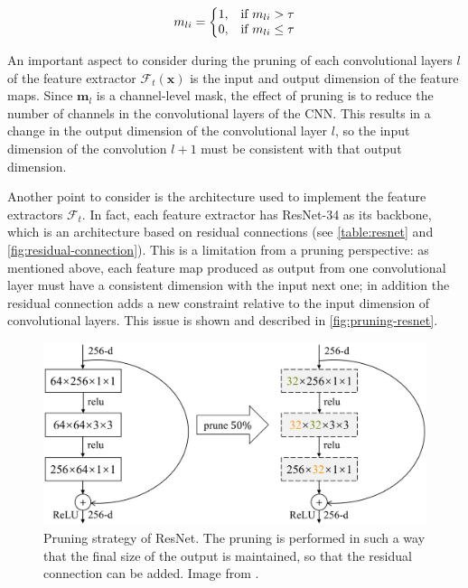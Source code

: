 \begin{align*}
    m_{li}&=\left\{
        \begin{array}{@{}ll@{}}
            1, & \text{if } m_{li} > \tau\\
            0, & \text{if } m_{li} \leq \tau\\
        \end{array}\right.\\
\end{align*}

An important aspect to consider during the pruning of each convolutional layers $l$ of the feature extractor $\mathcal{F}_t(\mathbf{x})$ is the input and output dimension of the feature maps.
Since $\mathbf{m}_l$ is a channel-level mask, the effect of pruning is to reduce the number of channels in the convolutional layers of the CNN.
This results in a change in the output dimension of the convolutional layer $l$, so the input dimension of the convolution $l+1$ must be consistent with that output dimension.

Another point to consider is the architecture used to implement the feature extractors $\mathcal{F}_t$. In fact, each feature extractor has ResNet-34 as its backbone, which is an architecture based on residual connections (see \autoref{table:resnet} and \autoref{fig:residual-connection}).
This is a limitation from a pruning perspective: as mentioned above, each feature map produced as output from one convolutional layer must have a consistent dimension with the input next one;
in addition the residual connection adds a new constraint relative to the input dimension of convolutional layers. This issue is shown and described in \autoref{fig:pruning-resnet}.


\begin{figure}[H]
    \begin{center}
        \includegraphics[width=\columnwidth]{images/resnet-pruning.png}
    \end{center}
    \caption{Pruning strategy of ResNet. The pruning is performed in such a way that the final size of the output is maintained, so that the residual connection can be added. Image from \cite{8416559}.}
    \label{fig:pruning-resnet}
\end{figure}

